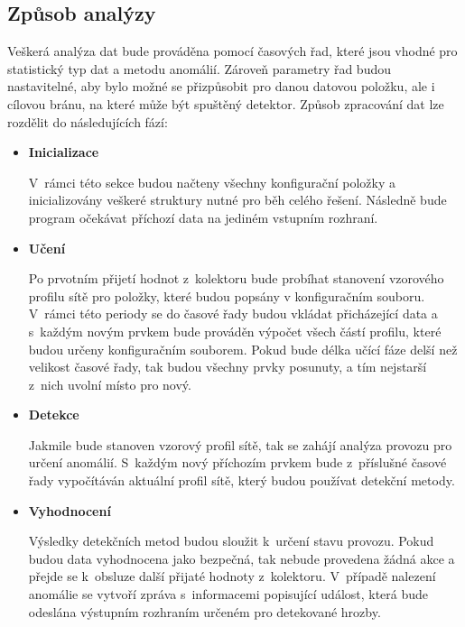  
 \subsection{Způsob analýzy}
 Veškerá analýza dat bude prováděna pomocí časových řad, které jsou vhodné pro statistický typ 
 dat a metodu anomálií. Zároveň parametry řad budou nastavitelné, aby bylo možné se přizpůsobit
 pro danou datovou položku, ale i cílovou bránu, na které může být spuštěný detektor. Způsob 
 zpracování dat lze rozdělit do následujících fází:
  \begin{itemize}
   \item \textbf{Inicializace}
   
   V~rámci této sekce budou načteny všechny konfigurační položky a inicializovány veškeré struktury
   nutné pro běh celého řešení. Následně bude program očekávat příchozí data na jediném vstupním
   rozhraní.
   
   \newpage
   \item \textbf{Učení}
   
   Po prvotním přijetí hodnot z~kolektoru bude probíhat stanovení vzorového profilu sítě pro položky,
   které budou popsány v konfiguračním souboru. V~rámci
   této periody se do časové řady budou vkládat přicházející data a s~každým novým prvkem 
   bude prováděn výpočet všech částí profilu, které budou určeny konfiguračním souborem.
   Pokud bude délka učící fáze delší než velikost 
   časové řady, tak budou všechny prvky posunuty, a tím nejstarší z~nich uvolní místo pro nový.
   
   \item \textbf{Detekce}
   
   Jakmile bude stanoven vzorový profil sítě, tak se zahájí analýza provozu pro určení anomálií.
   S~každým nový příchozím prvkem bude z~příslušné časové řady vypočítáván aktuální profil sítě,
   který budou používat detekční metody.
   
   \item \textbf{Vyhodnocení}
   
   Výsledky detekčních metod budou sloužit k~určení stavu provozu. Pokud budou data vyhodnocena jako
   bezpečná, tak nebude provedena žádná akce a přejde se k~obsluze další přijaté hodnoty z~kolektoru.
   V~případě nalezení anomálie se vytvoří zpráva s~informacemi popisující událost, která bude 
   odeslána výstupním rozhraním určeném pro detekované hrozby.   
  \end{itemize}
  
